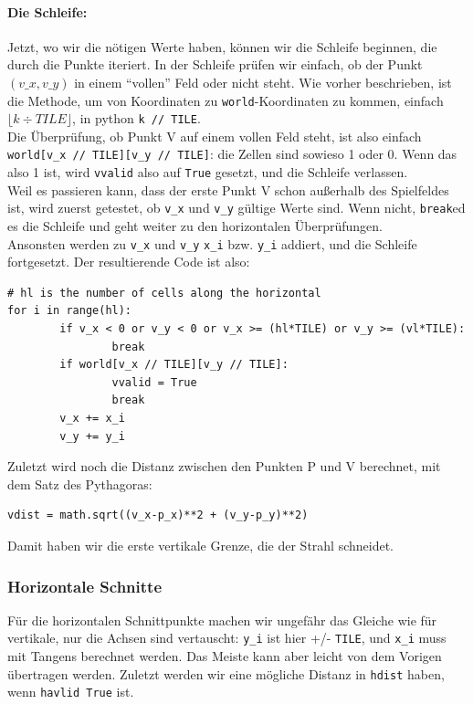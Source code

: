 \documentclass[a4paper,12pt]{report}
\begin{document}
\paragraph{Die Schleife:}
Jetzt, wo wir die n\"otigen Werte haben, k\"onnen wir die Schleife beginnen, die durch die Punkte iteriert. In der Schleife pr\"ufen wir einfach, ob der Punkt $(v\_x,v\_y)$ in einem ``vollen'' Feld oder nicht steht. Wie vorher beschrieben, ist die Methode, um von Koordinaten zu \texttt{world}-Koordinaten zu kommen, einfach $\lfloor k \div TILE \rfloor$, in python \texttt{k // TILE}. \\
Die Überpr\"ufung, ob Punkt V auf einem vollen Feld steht, ist also einfach \texttt{world[v\_x // TILE][v\_y // TILE]}: die Zellen sind sowieso 1 oder 0. Wenn das also 1 ist, wird \texttt{vvalid} also auf \texttt{True} gesetzt, und die Schleife verlassen. \\
Weil es passieren kann, dass der erste Punkt V schon au\ss erhalb des Spielfeldes ist, wird zuerst getestet, ob \texttt{v\_x} und \texttt{v\_y} g\"ultige Werte sind. Wenn nicht, \texttt{break}ed es die Schleife und geht weiter zu den horizontalen Überpr\"ufungen. \\
Ansonsten werden zu \texttt{v\_x} und \texttt{v\_y} \texttt{x\_i} bzw. \texttt{y\_i} addiert, und die Schleife fortgesetzt.
Der resultierende Code ist also:
\begin{Verbatim}[baselinestretch=1.0, xleftmargin=1cm]
# hl is the number of cells along the horizontal
for i in range(hl):
        if v_x < 0 or v_y < 0 or v_x >= (hl*TILE) or v_y >= (vl*TILE):
                break
        if world[v_x // TILE][v_y // TILE]:
                vvalid = True
                break
        v_x += x_i
        v_y += y_i
\end{Verbatim}

Zuletzt wird noch die Distanz zwischen den Punkten P und V berechnet, mit dem Satz des Pythagoras:
\begin{Verbatim}[baselinestretch=1.0, xleftmargin=1cm]
vdist = math.sqrt((v_x-p_x)**2 + (v_y-p_y)**2)
\end{Verbatim}
Damit haben wir die erste vertikale Grenze, die der Strahl schneidet.

\subsubsection{Horizontale Schnitte}
F\"ur die horizontalen Schnittpunkte machen wir ungef\"ahr das Gleiche wie f\"ur vertikale, nur die Achsen sind vertauscht: \texttt{y\_i} ist hier +/- \texttt{TILE}, und \texttt{x\_i} muss mit Tangens berechnet werden. Das Meiste kann aber leicht von dem Vorigen \"ubertragen werden. Zuletzt werden wir eine m\"ogliche Distanz in \texttt{hdist} haben, wenn \texttt{havlid True} ist.
\end{document}
